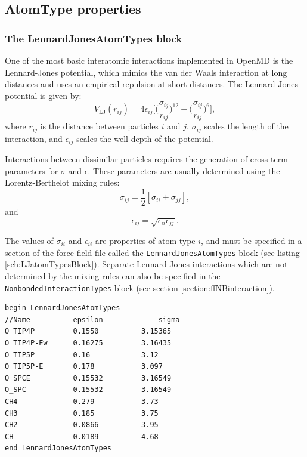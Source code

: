 \documentclass[]{book}
\begin{document}
\subsection{\label{section::ffAtomProperties}AtomType properties}
\subsubsection{\label{section:ffLJ}The LennardJonesAtomTypes block}
One of the most basic interatomic interactions implemented in {\sc
  OpenMD} is the Lennard-Jones potential, which mimics the van der
Waals interaction at long distances and uses an empirical repulsion at
short distances. The Lennard-Jones potential is given by:
\begin{equation}
V_{\text{LJ}}(r_{ij}) = 
	4\epsilon_{ij} \biggl[
	\biggl(\frac{\sigma_{ij}}{r_{ij}}\biggr)^{12}
	- \biggl(\frac{\sigma_{ij}}{r_{ij}}\biggr)^{6}
	\biggr],
\label{eq:lennardJonesPot}
\end{equation}
where $r_{ij}$ is the distance between particles $i$ and $j$,
$\sigma_{ij}$ scales the length of the interaction, and
$\epsilon_{ij}$ scales the well depth of the potential.

Interactions between dissimilar particles requires the generation of
cross term parameters for $\sigma$ and $\epsilon$. These parameters
are usually determined using the Lorentz-Berthelot mixing
rules:\cite{Allen87}
\begin{equation}
\sigma_{ij} = \frac{1}{2}[\sigma_{ii} + \sigma_{jj}],
\label{eq:sigmaMix}
\end{equation}
and
\begin{equation}
\epsilon_{ij} = \sqrt{\epsilon_{ii} \epsilon_{jj}}.
\label{eq:epsilonMix}
\end{equation}

The values of $\sigma_{ii}$ and $\epsilon_{ii}$ are properties of atom
type $i$, and must be specified in a section of the force field file
called the {\tt LennardJonesAtomTypes} block (see listing
\ref{sch:LJatomTypesBlock}).  Separate Lennard-Jones interactions
which are not determined by the mixing rules can also be specified in
the {\tt NonbondedInteractionTypes} block (see section
\ref{section:ffNBinteraction}).

\begin{lstlisting}[caption={[An example of a LennardJonesAtomTypes block.] A
simple example of a LennardJonesAtomTypee block.   Units for
$\epsilon$ are kcal / mol and for $\sigma$ are \AA\ .},
label={sch:LJatomTypesBlock}]
begin LennardJonesAtomTypes
//Name          epsilon             sigma       
O_TIP4P         0.1550          3.15365 
O_TIP4P-Ew      0.16275         3.16435
O_TIP5P         0.16            3.12   
O_TIP5P-E       0.178           3.097   
O_SPCE          0.15532         3.16549
O_SPC           0.15532         3.16549
CH4             0.279           3.73
CH3             0.185           3.75
CH2             0.0866          3.95
CH              0.0189          4.68
end LennardJonesAtomTypes
\end{lstlisting}
\end{document}
